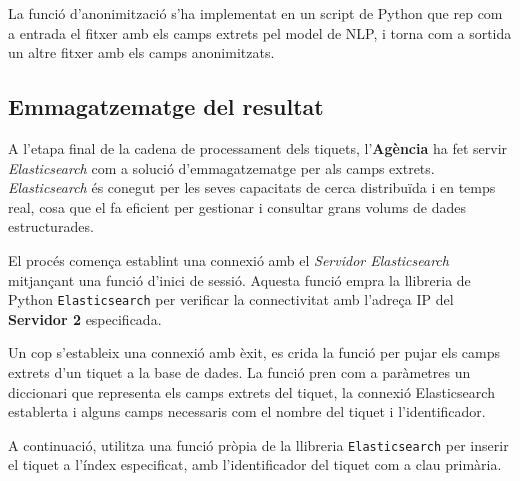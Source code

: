 La funció d'anonimització s'ha implementat en un script de Python que rep com a entrada el fitxer amb els camps extrets pel model de NLP, i torna com a sortida un altre fitxer amb els camps anonimitzats.


\subsection{Emmagatzematge del resultat}
A l'etapa final de la cadena de processament dels tiquets, l'\textbf{Agència} ha fet servir \textit{Elasticsearch} com a solució d'emmagatzematge per als camps extrets. \textit{Elasticsearch} és conegut per les seves capacitats de cerca distribuïda i en temps real, cosa que el fa eficient per gestionar i consultar grans volums de dades estructurades.

El procés comença establint una connexió amb el \textit{Servidor Elasticsearch} mitjançant una funció d'inici de sessió. Aquesta funció empra la llibreria de Python \texttt{Elasticsearch} per verificar la connectivitat amb l'adreça IP del \textbf{Servidor 2} especificada.

Un cop s'estableix una connexió amb èxit, es crida la funció per pujar els camps extrets d'un tiquet a la base de dades. La funció pren com a paràmetres un diccionari que representa els camps extrets del tiquet, la connexió Elasticsearch establerta i alguns camps necessaris com el nombre del tiquet i l'identificador.

A continuació, utilitza una funció pròpia de la llibreria \texttt{Elasticsearch} per inserir el tiquet a l'índex especificat, amb l'identificador del tiquet com a clau primària.
